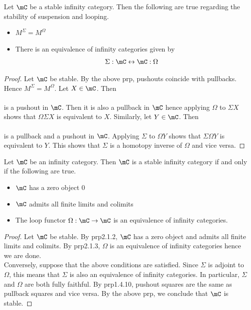 \documentclass[a4paper]{article}
\begin{document}
\begin{prp}{}{} Let $\mC$ be a stable infinity category. Then the following are true regarding the stability of suspension and looping. 
\begin{itemize}
\item $M^\Sigma=M^\Omega$
\item There is an equivalence of infinity categories given by $$\Sigma:\mC\leftrightarrow\mC:\Omega$$
\end{itemize} 
\begin{proof}
Let $\mC$ be stable. By the above prp, pushouts coincide with pullbacks. Hence $M^\Sigma=M^\Omega$. Let $X\in\mC$. Then \\
\\
is a pushout in $\mC$. Then it is also a pullback in $\mC$ hence applying $\Omega$ to $\Sigma X$ shows that $\Omega\Sigma X$ is equivalent to $X$. Similarly, let $Y\in\mC$. Then \\
\\
is a pullback and a pushout in $\mC$. Applying $\Sigma$ to $\Omega Y$ shows that $\Sigma\Omega Y$ is equivalent to $Y$. This shows that $\Sigma$ is a homotopy inverse of $\Omega$ and vice versa. 
\end{proof}
\end{prp}

\begin{prp}{}{} Let $\mC$ be an infinity category. Then $\mC$ is a stable infinity category if and only if the following are true. 
\begin{itemize}
\item $\mC$ has a zero object $0$
\item $\mC$ admits all finite limits and colimits
\item The loop functor $\Omega:\mC\to\mC$ is an equivalence of infinity categories. 
\end{itemize} 
\begin{proof}
Let $\mC$ be stable. By prp2.1.2, $\mC$ has a zero object and admits all finite limits and colimits. By prp2.1.3, $\Omega$ is an equivalence of infinity categories hence we are done. \\

Conversely, suppose that the above conditions are satisfied. Since $\Sigma$ is adjoint to $\Omega$, this means that $\Sigma$ is also an equivalence of infinity categories. In particular, $\Sigma$ and $\Omega$ are both fully faithful. By prp1.4.10, pushout squares are the same as pullback squares and vice versa. By the above prp, we conclude that $\mC$ is stable. 
\end{proof}
\end{prp}
\end{document}
